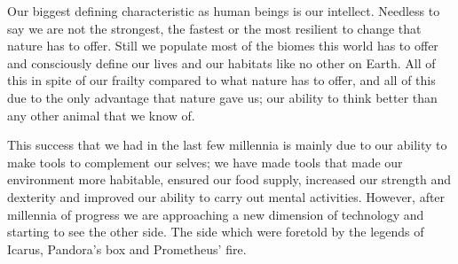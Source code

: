 Our biggest defining characteristic as human beings is our intellect. Needless to say we are not the strongest, the fastest or the most resilient to change that nature has to offer. Still we populate most of the biomes this world has to offer and consciously define our lives and our habitats like no other on Earth. All of this in spite of our frailty compared to what nature has to offer, and all of this due to the only advantage that nature gave us; our ability to think better than any other animal that we know of.

This success that we had in the last few millennia is mainly due to our ability to make tools to complement our selves; we have made tools that made our environment more habitable, ensured our food supply, increased our strength and dexterity and improved our ability to carry out mental activities. However, after millennia of progress we are approaching a new dimension of technology and starting to see the other side. The side which were foretold by the legends of Icarus, Pandora’s box and Prometheus’ fire. 
